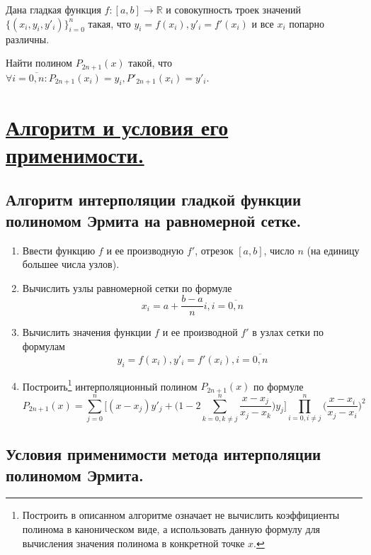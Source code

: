 \documentclass[a4paper, 12pt]{article}
\begin{document}
	Дана гладкая функция $f:[a,b]\rightarrow \mathbb{R}$ и совокупность троек значений $\{(x_i,y_i,y'_i)\}_{i=0}^n$ такая, что $y_i=f(x_i), y'_i=f'(x_i)$ и все $x_i$ попарно различны. 
	
	Найти полином $P_{2n+1}(x)$ такой, что $\forall i=\overline{0,n} : P_{2n+1}(x_i)=y_i, P'_{2n+1}(x_i) =y'_i$.
	
	\section{\underline{Алгоритм и условия его применимости.}}
	
	\subsection{Алгоритм интерполяции гладкой функции полиномом Эрмита на равномерной сетке.}
	
	\begin{enumerate}
		\item Ввести функцию $f$ и ее производную $f'$, отрезок $[a,b]$, число $n$ (на единицу большее числа узлов).
		\item Вычислить узлы равномерной сетки по формуле
		\begin{equation}
			x_i=a+\frac{b-a}{n}i, i=\overline{0,n}
		\end{equation}
		\item Вычислить значения функции $f$ и ее производной $f'$ в узлах сетки по формулам
		\begin{equation}
			y_i=f(x_i),
			y'_i=f'(x_i), i=\overline{0,n}
		\end{equation}
		\item Построить\footnote{Построить в описанном алгоритме означает не вычислить коэффициенты полинома в каноническом виде, а использовать данную формулу для вычисления значения полинома в конкретной точке $x$.} интерполяционный полином $P_{2n+1}(x)$ по формуле
		\begin{equation}
			P_{2n+1}(x)=\sum\limits_{j=0}^n\bigg[(x-x_j)y'_j+\bigg(1-2\sum\limits_{k=0,k\neq j}^n\frac{x-x_j}{x_j-x_k}\bigg)y_j\bigg]\prod\limits_{i=0,i\neq j}^n\bigg(\frac{x-x_i}{x_j-x_i}\bigg)^2
		\end{equation}	
		
	\end{enumerate}

	\subsection{Условия применимости метода интерполяции полиномом Эрмита.}
	
\end{document}
